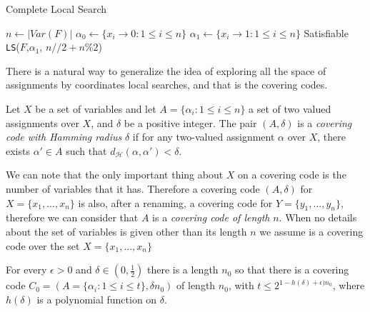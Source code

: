\begin{algorithm}
  \caption{Complete Local Search}\label{cls}
  \begin{algorithmic}[1]
    \State $n \gets |Var(F)|$
    \State $\alpha_0 \gets \{x_i \to 0 : 1 \le i \le n\}$
    \State $\alpha_1 \gets \{x_i \to 1 : 1 \le i \le n\}$
    \State
     \Return Satisfiable 
    \EndIf
    \State \Return \texttt{LS}($F$,$\alpha_1$, $n//2 + n\%2$)

\end{algorithmic}
\end{algorithm}



There is a natural way to generalize the idea of exploring all the space of assignments by coordinates local searches, and that is the covering codes.

\begin{definition}
  Let $X$ be a set of variables and let $A = \{\alpha_i: 1 \le i \le n\}$ a set of two valued assignments over $X$, and $\delta$ be a positive integer. The pair $(A,\delta)$ is a \emph{covering code with Hamming radius} $\delta$ if for any  two-valued assignment  $\alpha$  over $X$, there exists $\alpha'\in A$ such that $d_\mathcal{H} (\alpha, \alpha') < \delta$.
\end{definition}

We can note that the only important thing about $X$ on a covering code is the number of variables that it has. Therefore a covering code $(A,\delta)$ for $X=\{x_1,...,x_n\}$ is also, after a renaming, a covering code for $Y=\{y_1,...,y_n\}$, therefore we can consider that $A$ is a \emph{covering code of length} $n$. When no details about the set of variables is given other than its length $n$ we assume is a covering code over the set $X = \{x_1,...,x_n\}$


\begin{lemma}
For every $\epsilon > 0$ and $\delta \in (0, \frac{1}{2})$ there is a length $n_0$ so that there is a covering code $C_0 = (A=\{\alpha_i : 1\le i\le t\}, \delta n_0)$ of length $n_0$, with $t\le 2^{1-h(\delta)+\epsilon)n_0}$, where $h(\delta)$ is a  polynomial function on $\delta$.
\end{lemma}

